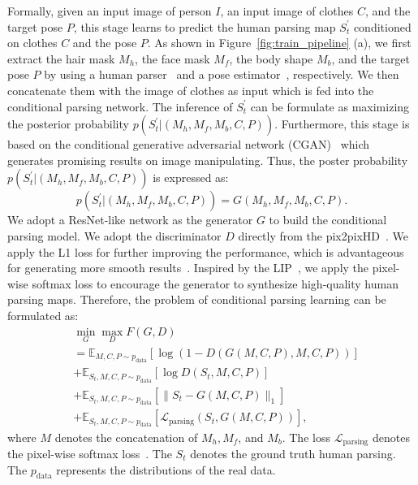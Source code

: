 \documentclass[10pt,twocolumn,letterpaper]{article}
\begin{document}
Formally, given an input image of person $I$, an input image of clothes $C$, and the target pose $P$, this stage learns to predict the human parsing map $S^{'}_t$ conditioned on clothes $C$ and the pose $P$. As shown in Figure~\ref{fig:train_pipeline} (a), we first extract the hair mask $M_h$, the face mask $M_f$, the body shape  $M_b$, and the target pose $P$ by using a human parser~\cite{gong2017look} and a pose estimator~\cite{cao2017openpose}, respectively. We then concatenate them with the image of clothes as input which is fed into the conditional parsing network. The inference of $S^{'}_t$ can be formulate as maximizing the posterior probability $p(S^{'}_t | (M_h, M_f, M_b, C, P))$. Furthermore, this stage is based on the conditional generative adversarial network (CGAN)~\cite{mirza2014cgan} which generates promising results on image manipulating. Thus, the poster probability $p(S^{'}_t | (M_h, M_f, M_b, C, P))$ is expressed as:
\begin{equation}
p(S^{'}_t | (M_h, M_f, M_b, C, P)) = G(M_h, M_f, M_b, C, P).
\end{equation}
We adopt a ResNet-like network as the generator $G$ to build the conditional parsing model. We adopt the discriminator $D$ directly from the pix2pixHD~\cite{wang2017pix2pixHD}. We apply the L1 loss for further improving the performance, which is advantageous for generating more smooth results~\cite{yan2017skeleton}. Inspired by the LIP~\cite{gong2017look}, we apply the pixel-wise softmax loss to encourage the generator to synthesize high-quality human parsing maps. Therefore, the problem of conditional parsing learning can be formulated as:
\begin{equation}
\begin{aligned}
    &\min_{G} \max_{D} F(G, D) \\
    & = \mathbb{E}_{M, C, P \sim p_{\text{data}}}[ \log (1 - D(G(M, C, P), M, C, P))]  \\
    & + \mathbb{E}_{S_t, M, C, P \sim p_{\text{data}}}[\log D(S_t, M, C, P)] \\
    & + \mathbb{E}_{S_t, M, C, P \sim p_{\text{data}}}[\| S_t - G(M, C, P)\|_1] \\ 
    & + \mathbb{E}_{S_t, M, C, P \sim p_{\text{data}}}[\mathcal{L}_{\text{parsing}}(S_t, G(M, C, P))],
   \label{eq:parsing}
\end{aligned}
\end{equation}
where $M$ denotes the concatenation of $M_h, M_f$, and $M_b$. The loss $\mathcal{L}_{\text{parsing}}$ denotes the pixel-wise softmax loss~\cite{gong2017look}. The $S_t$ denotes the ground truth human parsing. The $p_{\text{data}}$ represents the distributions of the real data. 
\end{document}
